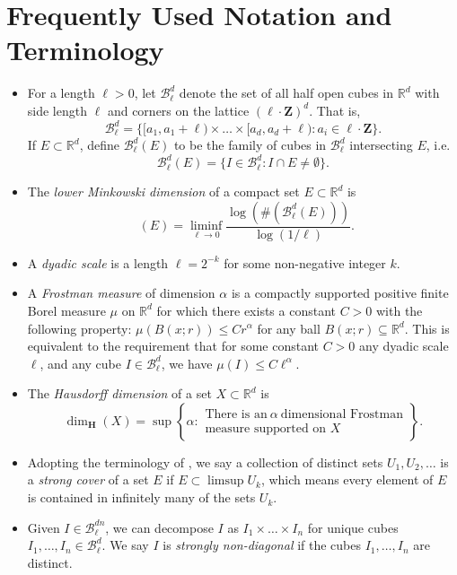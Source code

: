 \documentclass[usenames,dvipsnames,letterpaper, reqno,11pt]{article}
\theoremstyle{plain}
\theoremstyle{plain}
\DeclareMathOperator{\lhdim}{\underline{\dim}_{\mathbf{M}}}
\newcommand{\RR}{\mathbb{R}}
\begin{document}
\section{Frequently Used Notation and Terminology}

\begin{itemize}
	\item For a length $\ell>0$, let $\mathcal{B}^d_\ell$ denote the set of all half open cubes in $\RR^d$ with side length $\ell$ and corners on the lattice $(\ell \cdot \mathbf{Z})^d$. That is,
	\[ \mathcal{B}^d_\ell = \{ [a_1,a_1 + \ell) \times \dots \times [a_d, a_d + \ell) : a_i \in \ell \cdot \mathbf{Z} \}. \]
	If $E \subset \RR^d$, define $\mathcal{B}^d_\ell(E)$ to be the family of cubes in $\mathcal{B}^d_\ell$ intersecting $E$, i.e.
	\[\mathcal{B}^d_\ell(E) = \{ I \in \mathcal{B}^d_\ell: I \cap E \neq \emptyset \}. \]

	\item The {\it lower Minkowski dimension} of a compact set $E \subset \RR^d$ is
	\[ \lhdim(E) = \liminf_{\ell \to 0} \frac{\log( \#( \mathcal{B}^d_\ell(E) ) )}{\log(1/\ell)}. \]

	\item A {\it dyadic scale} is a length $\ell = 2^{-k}$ for some non-negative integer $k$.

	\item A {\it Frostman measure} of dimension $\alpha$ is a compactly supported positive finite Borel measure $\mu$ on $\RR^d$ for which there exists a constant $C > 0$ with the following property: $\mu(B(x;r)) \leq C r^\alpha$ for any ball $B(x;r) \subseteq \mathbb R^d$. This is equivalent to the requirement that for some constant $C > 0$ any dyadic scale $\ell$, and any cube $I \in \mathcal{B}^d_\ell$, we have $\mu(I) \leq C \ell^\alpha$.

	\item The {\it Hausdorff dimension} of a set $X \subset \RR^d$ is
	\[ \dim_{\mathbf{H}}(X) = \sup \left\{ \alpha: \begin{array}{c} \text{There is an}\ \alpha\ \text{dimensional Frostman}\\
	\text{measure supported on $X$} \end{array} \right\}. \]

	\item Adopting the terminology of \cite{KatzTao}, we say a collection of distinct sets $U_1, U_2, \dots$ is a {\it strong cover} of a set $E$ if $E \subset \limsup U_k$, which means every element of $E$ is contained in infinitely many of the sets $U_k$.

	\item Given $I \in \mathcal{B}^{dn}_\ell$, we can decompose $I$ as $I_1 \times \dots \times I_n$ for unique cubes $I_1, \dots, I_n \in \mathcal{B}^d_\ell$. We say $I$ is {\it strongly non-diagonal} if the cubes $I_1, \dots, I_n$ are distinct.
\end{itemize}
\end{document}
